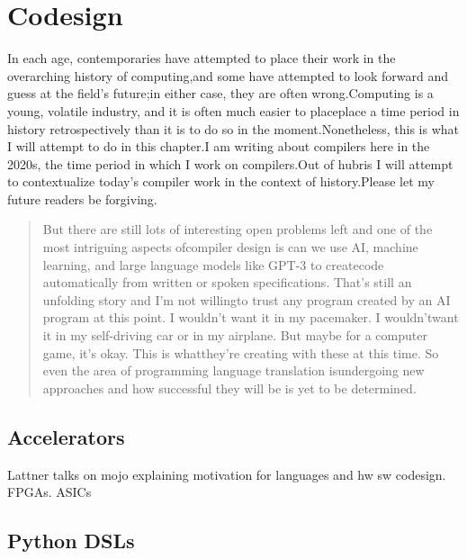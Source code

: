 \chapter{Codesign}

In each age, contemporaries have attempted to place their work in the
overarching history of computing,and some have attempted to look forward and
guess at the field's future;in either case, they are often wrong.Computing is a
young, volatile industry, and it is often much easier to placeplace a time
period in history retrospectively than it is to do so in the
moment.Nonetheless, this is what I will attempt to do in this chapter.I am
writing about compilers here in the 2020s, the time period in which I work on
compilers.Out of hubris I will attempt to contextualize today's compiler work
in the context of history.Please let my future readers be
forgiving.

\begin{quotation}
	But there are still lots of interesting open problems left and one of the most
	intriguing aspects ofcompiler design is can we use AI, machine learning, and
	large language models like GPT-3 to createcode automatically from written or
	spoken specifications. That's still an unfolding story and I'm not willingto
	trust any program created by an AI program at this point. I wouldn't want it in
	my pacemaker. I wouldn'twant it in my self-driving car or in my airplane. But
	maybe for a computer game, it's okay. This is whatthey're creating with these
	at this time. So even the area of programming language translation isundergoing
	new approaches and how successful they will be is yet to be
	determined.\cite{aho_oral_history_2022}
\end{quotation}



\section{Accelerators}
Lattner talks on mojo explaining motivation for languages and hw sw codesign.
FPGAs. ASICs

\section{Python DSLs}
